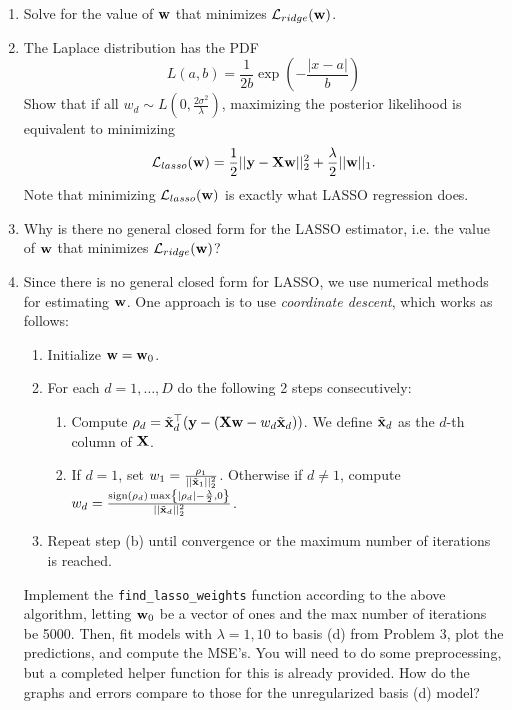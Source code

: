 \documentclass[submit]{../harvardml}
\begin{document}
\begin{problem}
\begin{enumerate}
    \item Solve for the value of $\mathbf{w}$ that minimizes $\mathcal L_{ridge}(\mathbf{w})$.

    \item The Laplace distribution has the PDF
   \[L(a,b) =\frac{1}{2b} \exp\left(-\frac{|x - a|}{b}\right)\]
Show that if all $w_d \sim L\left(0,\frac{2\sigma^2}{\lambda}\right)$, maximizing the posterior likelihood is equivalent to minimizing 
\[\mathcal{L}_{lasso}(\mathbf{w}) = \frac{1}{2}||\mathbf{y} -\bold X\mathbf{w}||_2^2  + \frac{\lambda}{2}||\mathbf{w}||_1.\] 
Note that minimizing $\mathcal{L}_{lasso}(\mathbf{w})$ is exactly what LASSO regression does.

    \item Why is there no general closed form for the LASSO estimator, i.e. the value of $\mathbf{w}$ that minimizes $\mathcal{L}_{ridge}(\mathbf{w})$?

    \item Since there is no general closed form for LASSO, we use numerical methods for estimating $\mathbf{w}$. One approach is to use \textit{coordinate descent}, which works as follows: 
    \begin{enumerate}
        \item Initialize $\mathbf{w}=\mathbf{w}_0$.
        \item For each $d=1, \ldots, D$ do the following 2 steps consecutively:
        \begin{enumerate}
            \item Compute $\rho_d = \tilde{\mathbf{x}}_d^\top(\mathbf{y} - (\mathbf{X} \mathbf{w} - w_d \tilde{\mathbf{x}}_d))$. We define $\tilde{\mathbf{x}}_d$ as the $d$-th column of $\mathbf{X}$.

            \item If $d=1$, set $w_1 = \frac{\rho_1}{||\tilde{\mathbf{x}}_1||^2_2}$. Otherwise if $d\ne 1$, compute $w_d = \frac{\text{sign}(\rho_d)\max\left\{|\rho_d|-\frac{\lambda}{2}, 0\right\}}{||\tilde{\mathbf{x}}_d||^2_2}$.
        \end{enumerate}
        \item Repeat step (b) until convergence or the maximum number of iterations is reached.
    \end{enumerate} 

    Implement the \texttt{find\_lasso\_weights} function according to the above algorithm, letting $\mathbf{w}_0$ be a vector of ones and the max number of iterations be 5000. Then, fit models with $\lambda=1, 10$ to basis (d) from Problem 3, plot the predictions, and compute the MSE's. You will need to do some preprocessing, but a completed helper function for this is already provided. How do the graphs and errors compare to those for the unregularized basis (d) model? 


\end{enumerate}

\end{problem}
\end{document}
